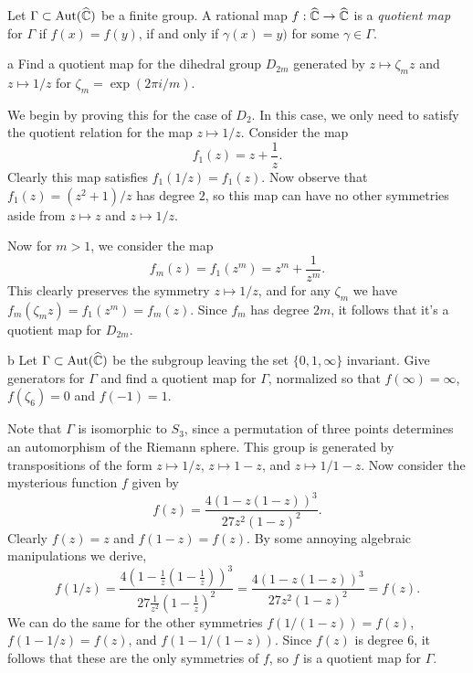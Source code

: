 \documentclass{pset}
\begin{document}
\begin{problem}{2.3}
  Let $\Gamma \subset \textrm{Aut}(\widehat{\mathbb{C}})$ be a finite group. A rational map $f : \widehat{\mathbb{C}} \to \widehat{\mathbb{C}}$ is a \emph{quotient map} for $\Gamma$ if $f(x)=f(y)$, if and only if $\gamma(x) = y)$ for some $\gamma\in \Gamma$.
\end{problem}

\begin{parts}
  \begin{part}{a}
    Find a quotient map for the dihedral group $D_{2m}$ generated by $z \mapsto \zeta_m z$ and $z\mapsto 1/z$ for $\zeta_m = \exp(2\pi i/m)$.
  \end{part}

  We begin by proving this for the case of $D_{2}$. In this case, we only need to satisfy the quotient relation for the map $z \mapsto 1/z$. Consider the map
  \[
    f_1(z) = z+\frac{1}{z}.
  \]
  Clearly this map satisfies $f_1(1/z) = f_1(z)$. Now observe that $f_1(z) = (z^2+1)/z$ has degree $2$, so this map can have no other symmetries aside from $z\mapsto z$ and $z\mapsto 1/z$.

  Now for $m>1$, we consider the map
  \[
    f_m(z) =f_1(z^m)= z^m + \frac{1}{z^m}.
  \]
  This clearly preserves the symmetry $z\mapsto 1/z$, and for any $\zeta_m$ we have $f_m(\zeta_m z) = f_1(z^m) = f_m(z)$. Since $f_m$ has degree $2m$, it follows that it's a quotient map for $D_{2m}$.

  \begin{part}{b}
    Let $\Gamma \subset \textrm{Aut}(\widehat{\mathbb{C}})$ be the subgroup leaving the set $\{0, 1, \infty\}$ invariant. Give generators for $\Gamma$ and find a quotient map for $\Gamma$, normalized so that $f(\infty) = \infty$, $f(\zeta_6) = 0$ and $f(-1)=1$.
  \end{part}

  Note that $\Gamma$ is isomorphic to $S_3$, since a permutation of three points determines an automorphism of the Riemann sphere. This group is generated by transpositions of the form $z\mapsto 1/z$, $z\mapsto 1-z$, and $z\mapsto 1/1-z$. Now consider the mysterious function $f$ given by
  \[
    f(z) = \frac{4(1-z(1-z))^3}{27z^2(1-z)^2}.
  \]
  Clearly $f(z)=z$ and $f(1-z)=f(z)$. By some annoying algebraic manipulations we derive,
  \[
    f(1/z) = \frac{4\left(1-\frac{1}{z}\left(1-\frac{1}{z}\right)\right)^3}{27\frac{1}{z^2}\left(1-\frac{1}{z}\right)^2} = \frac{4\left(1-z(1-z)\right)^3}{27z^2(1-z)^2}=f(z).
  \]
  We can do the same for the other symmetries $f(1/(1-z))=f(z)$, $f(1-1/z)=f(z)$, and $f(1-1/(1-z))$. Since $f(z)$ is degree $6$, it follows that these are the only symmetries of $f$, so $f$ is a quotient map for $\Gamma$.
\end{parts}
\end{document}
